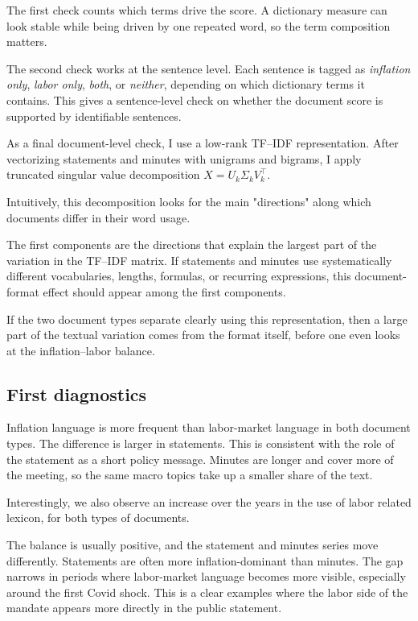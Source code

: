 \documentclass{article}
\newcommand{\tfidf}{TF--IDF}
\begin{document}
The first check counts which terms drive the score. A dictionary measure can look stable
while being driven by one repeated word, so the term composition matters. 

The second check works at the sentence level. Each sentence is tagged as \emph{inflation only},
\emph{labor only}, \emph{both}, or \emph{neither}, depending on which dictionary terms it contains. This gives a sentence-level check on whether the document score is supported by identifiable sentences.

As a final document-level check, I use a low-rank \tfidf{} representation. After
vectorizing statements and minutes with unigrams and bigrams, I apply truncated singular value decomposition $ X = U_k \Sigma_k V_k^\top$.



Intuitively, this decomposition looks for the main "directions" along which documents differ
in their word usage. 

The first components are the directions that explain the largest part of the variation in the \tfidf{} matrix. If statements and minutes use systematically
different vocabularies, lengths, formulas, or recurring expressions, this document-format
effect should appear among the first components. 

If the two document types separate
clearly using this representation, then a large part of the textual variation comes from the format itself, before
one even looks at the inflation--labor balance.

\subsection*{First diagnostics}


Inflation language is more frequent than labor-market language in both document types.
The difference is larger in statements. This is consistent with the role of the statement as a short policy message. Minutes are longer and cover more of the meeting, so the same macro topics take up a smaller share of the text.

Interestingly, we  also observe an increase over the years in the use of labor related lexicon, for both types of documents.

The balance is usually positive, and the statement and minutes series move differently. 
Statements are often more inflation-dominant than minutes. The gap narrows in periods
where labor-market language becomes more visible, especially around the first Covid
shock. This is a clear examples where the labor side of the mandate appears
more directly in the public statement. 
\end{document}
